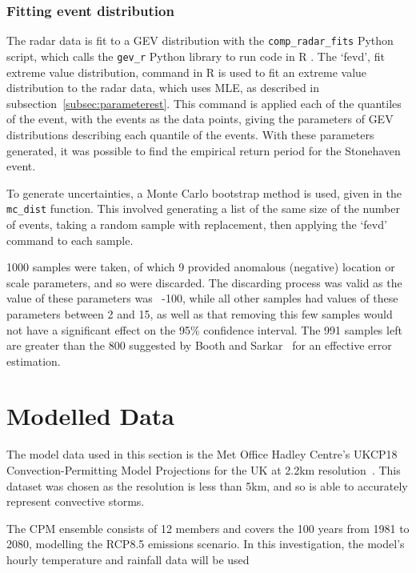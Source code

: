 \documentclass[12pt,a4paper]{report}
\begin{document}
\subsubsection{Fitting event distribution}

The radar data is fit to a GEV distribution with the \texttt{comp\_radar\_fits} Python script,
    which calls the \texttt{gev\_r} Python library to run code in R .
The `fevd', fit extreme value distribution,
    command in R is used to fit an extreme value distribution to the radar data,
    which uses MLE, as described in subsection~\ref{subsec:parameterest}.
This command is applied each of the quantiles of the event,
    with the events as the data points,
    giving the parameters of GEV distributions describing each quantile of the events.
With these parameters generated,
     it was possible to find the empirical return period for the Stonehaven event.

To generate uncertainties,
    a Monte Carlo bootstrap method is used,
    given in the \texttt{mc\_dist} function.
This involved generating a list of the same size of the number of events,
    taking a random sample with replacement,
    then applying the `fevd' command to each sample.

1000 samples were taken,
    of which 9 provided anomalous (negative) location or scale parameters,
    and so were discarded.
The discarding process was valid as the value of these parameters was ~-100,
    while all other samples had values of these parameters between 2 and 15,
    as well as that removing this few samples would not have a significant effect on the 95\% confidence interval.
The 991 samples left are greater than the 800 suggested by Booth and Sarkar~\cite{Booth_Sarkar_1998}
    for an effective error estimation.

\section{Modelled Data}\label{sec:model}

The model data used in this section is
    the Met Office Hadley Centre's UKCP18 Convection-Permitting Model Projections for the UK at 2.2km resolution~\cite{model_data}.
This dataset was chosen as the resolution is less than 5km,
    and so is able to accurately represent convective storms.

The CPM ensemble consists of 12 members and covers the 100 years from 1981 to 2080,
    modelling the RCP8.5 emissions scenario.
In this investigation,
    the model's hourly temperature and rainfall data will be used
\end{document}
